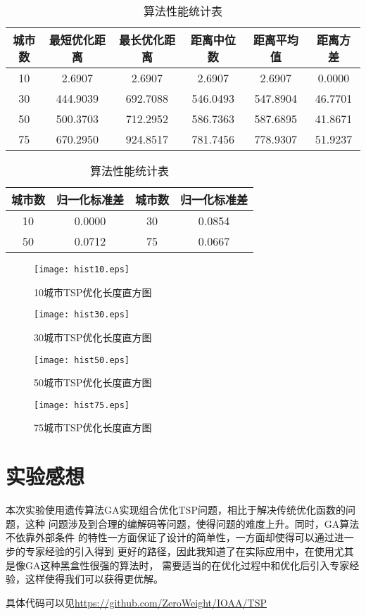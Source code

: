\documentclass[UTF8,a4paper]{paper}
\begin{document}
\begin{table}[h]\centering\caption{算法性能统计表}\label{T}
\begin{tabular}{|c|c|c|c|c|c|}\hline
城市数 & 最短优化距离 & 最长优化距离 & 距离中位数 & 距离平均值 & 距离方差\\ \hline 
10 & 2.6907 & 2.6907 & 2.6907 & 2.6907 & 0.0000 \\ \hline
30 & 444.9039 & 692.7088 & 546.0493 & 547.8904 & 46.7701 \\ \hline
50 & 500.3703 & 712.2952 & 586.7363 & 587.6895 & 41.8671 \\ \hline
75 & 670.2950 & 924.8517 & 781.7456 & 778.9307 & 51.9237 \\ \hline
\end{tabular}

\begin{tabular}{|c|c|c|c|}\hline
城市数 & 归一化标准差 &城市数 & 归一化标准差\\ \hline
10 & 0.0000 & 30 & 0.0854 \\ \hline
50 & 0.0712 & 75& 0.0667 \\ \hline
\end{tabular}\end{table}

\begin{multicols}{2}
\begin{figure}[H]\centering\texttt{[image: hist10.eps]}
\caption{10城市TSP优化长度直方图}\label{F1hist}\end{figure}
\begin{figure}[H]\centering\texttt{[image: hist30.eps]}
\caption{30城市TSP优化长度直方图}\label{F2hist}\end{figure}
\begin{figure}[H]\centering\texttt{[image: hist50.eps]}
\caption{50城市TSP优化长度直方图}\label{F3hist}\end{figure}
\begin{figure}[H]\centering\texttt{[image: hist75.eps]}
\caption{75城市TSP优化长度直方图}\label{F4hist}\end{figure}
\end{multicols}


\section{实验感想}
本次实验使用遗传算法GA实现组合优化TSP问题，相比于解决传统优化函数的问题，这种
问题涉及到合理的编解码等问题，使得问题的难度上升。同时，GA算法不依靠外部条件
的特性一方面保证了设计的简单性，一方面却使得可以通过进一步的专家经验的引入得到
更好的路径，因此我知道了在实际应用中，在使用尤其是像GA这种黑盒性很强的算法时，
需要适当的在优化过程中和优化后引入专家经验，这样使得我们可以获得更优解。

具体代码可以见\url{https://github.com/ZeroWeight/IOAA/TSP}
\end{document}
